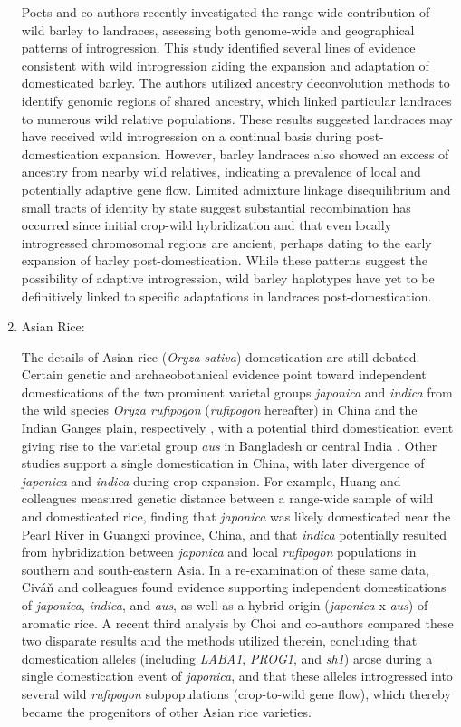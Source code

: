 \documentclass[11pt]{article}
\begin{document}
\begin{enumerate}
Poets and co-authors \cite{Poets2015} recently investigated the range-wide contribution of wild barley to landraces, assessing both genome-wide and geographical patterns of introgression.
This study identified several lines of evidence consistent with wild introgression aiding the expansion and adaptation of domesticated barley.
The authors utilized ancestry deconvolution methods to identify genomic regions of shared ancestry, which linked particular landraces to numerous wild relative populations.
These results suggested landraces may have received wild introgression on a continual basis during post-domestication expansion.
However, barley landraces also showed an excess of ancestry from nearby wild relatives, indicating a prevalence of local and potentially adaptive gene flow.
Limited admixture linkage disequilibrium and small tracts of identity by state suggest substantial recombination has occurred since initial crop-wild hybridization and that even locally introgressed chromosomal regions are ancient, perhaps dating to the early expansion of barley post-domestication.
While these patterns suggest the possibility of adaptive introgression, wild barley haplotypes have yet to be definitively linked to specific adaptations in landraces post-domestication.

\item{Asian Rice:}

The details of Asian rice (\emph{Oryza sativa}) domestication are still debated.
Certain genetic and archaeobotanical evidence point toward independent domestications of the two prominent varietal groups \emph{japonica} and \emph{indica} from the wild species \emph{Oryza rufipogon} (\emph{rufipogon} hereafter) in China and the Indian Ganges plain, respectively \cite{fuller2010consilience}, with a potential third domestication event giving rise to the varietal group \emph{aus} in Bangladesh or central India \cite{civavn2015three}.
Other studies support a single domestication in China, with later divergence of \emph{japonica} and \emph{indica} \cite{molina2011molecular, Huang2012} during crop expansion.
For example, Huang and colleagues \cite{Huang2012} measured genetic distance between a range-wide sample of wild and domesticated rice, finding that \emph{japonica} was likely domesticated near the Pearl River in Guangxi province, China, and that \emph{indica} potentially resulted from hybridization between \emph{japonica} and local \emph{rufipogon} populations in southern and south-eastern Asia.
In a re-examination of these same data, Civ\'{a}\v{n} and colleagues \cite{civavn2015three} found evidence supporting independent domestications of \emph{japonica}, \emph{indica}, and \emph{aus}, as well as a hybrid origin (\emph{japonica} x \emph{aus}) of aromatic rice.
A recent third analysis by Choi and co-authors \cite{choi2018multiple} compared these two disparate results and the methods utilized therein, concluding that domestication alleles (including \emph{LABA1}, \emph{PROG1}, and \emph{sh1}) arose during a single domestication event of \emph{japonica}, and that these alleles introgressed into several wild \emph{rufipogon} subpopulations (crop-to-wild gene flow), which thereby became the progenitors of other Asian rice varieties.


\end{enumerate}
\end{document}
